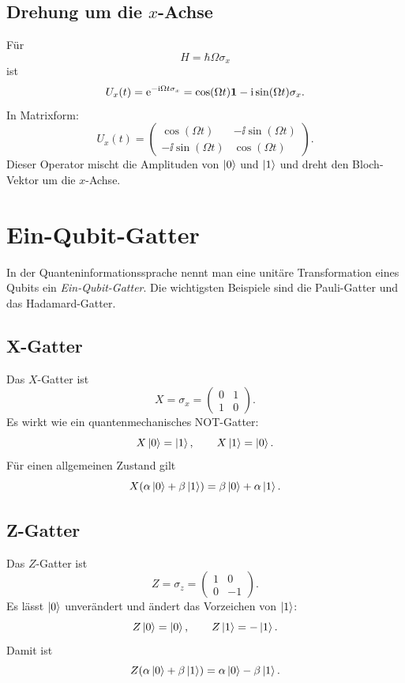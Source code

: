 \subsection{Drehung um die \(x\)-Achse}

Für
\[
    H=\hbar\Omega\sigma_x
\]
ist
\[
    U_x(t)=\mathrm{e}^{-\mathrm{i}\Omega t\sigma_x}
    =\cos(\Omega t)\mathbf{1}-\mathrm{i}\sin(\Omega t)\sigma_x.
\]
In Matrixform:
\[
    U_x(t)=
    \begin{pmatrix}
        \cos(\Omega t)&-\ii\sin(\Omega t)\\
        -\ii\sin(\Omega t)&\cos(\Omega t)
    \end{pmatrix}.
\]
Dieser Operator mischt die Amplituden von \(\left|0\right\rangle\) und \(\left|1\right\rangle\) und dreht den Bloch-Vektor um die \(x\)-Achse.

\section{Ein-Qubit-Gatter}

In der Quanteninformationssprache nennt man eine unitäre Transformation eines Qubits ein \emph{Ein-Qubit-Gatter}. Die wichtigsten Beispiele sind die Pauli-Gatter und das Hadamard-Gatter.

\subsection{X-Gatter}

Das \(X\)-Gatter ist
\[
    X=\sigma_x=\begin{pmatrix}0&1\\1&0\end{pmatrix}.
\]
Es wirkt wie ein quantenmechanisches NOT-Gatter:
\[
    X\left|0\right\rangle=\left|1\right\rangle,
    \qquad
    X\left|1\right\rangle=\left|0\right\rangle.
\]
Für einen allgemeinen Zustand gilt
\[
    X(\alpha\left|0\right\rangle+\beta\left|1\right\rangle)
    =\beta\left|0\right\rangle+\alpha\left|1\right\rangle.
\]

\subsection{Z-Gatter}

Das \(Z\)-Gatter ist
\[
    Z=\sigma_z=\begin{pmatrix}1&0\\0&-1\end{pmatrix}.
\]
Es lässt \(\left|0\right\rangle\) unverändert und ändert das Vorzeichen von \(\left|1\right\rangle\):
\[
    Z\left|0\right\rangle=\left|0\right\rangle,
    \qquad
    Z\left|1\right\rangle=-\left|1\right\rangle.
\]
Damit ist
\[
    Z(\alpha\left|0\right\rangle+\beta\left|1\right\rangle)
    =\alpha\left|0\right\rangle-\beta\left|1\right\rangle.
\]

